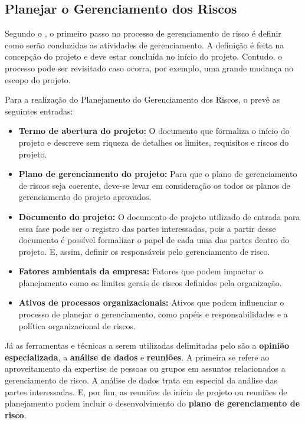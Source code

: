 \documentclass[
    12pt,       %
    openright,      %
    twoside,      %
    a4paper,      %
    english,      %
    french,       %
    spanish,      %
    brazil,       %
    ]{abntex2}
\begin{document}
\subsection{Planejar o Gerenciamento dos Riscos}

Segundo o \cite{PMBOK:2017}, o primeiro passo no processo de gerenciamento de risco é definir como serão conduzidas as atividades de gerenciamento. A definição é feita na concepção do projeto e deve estar concluída no início do projeto. Contudo, o processo pode ser revisitado caso ocorra, por exemplo, uma grande mudança no escopo do projeto.

Para a realização do Planejamento do Gerenciamento dos Riscos, o  prevê as seguintes entradas:

\begin{itemize}
    \item\textbf{Termo de abertura do projeto:} O documento que formaliza o início do projeto e descreve sem riqueza de detalhes os limites, requisitos e riscos do projeto.  
    \item\textbf{Plano de gerenciamento do projeto:} Para que o plano de gerenciamento de riscos seja coerente, deve-se levar em consideração os todos os planos de gerenciamento do projeto aprovados.
    \item\textbf{Documento do projeto:} O documento de projeto utilizado de entrada para essa fase pode ser o registro das partes interessadas, pois a partir desse documento é possível formalizar o papel de cada uma das partes dentro do projeto. E, assim, definir os responsáveis pelo gerenciamento de risco.
    \item\textbf{Fatores ambientais da empresa:} Fatores que podem impactar o planejamento como os limites gerais de riscos definidos pela organização.
    \item\textbf{Ativos de processos organizacionais:} Ativos que podem influenciar o processo de planejar o gerenciamento, como papéis e responsabilidades e a política organizacional de riscos.
\end{itemize}

Já as ferramentas e técnicas a serem utilizadas delimitadas pelo  são a \textbf{opinião especializada}, a \textbf{análise de dados} e \textbf{reuniões}. A primeira se refere ao aproveitamento da expertise de pessoas ou grupos em assuntos relacionados a gerenciamento de risco. A análise de dados trata em especial da análise das partes interessadas. E, por fim, as reuniões de início de projeto ou reuniões de planejamento podem incluir o desenvolvimento do \textbf{plano de gerenciamento de risco}.
\end{document}
